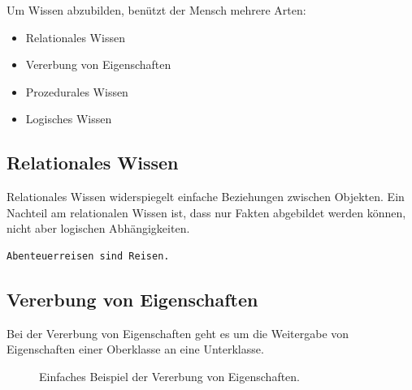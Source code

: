 Um Wissen abzubilden, benützt der Mensch mehrere Arten:
\begin{itemize}
    \item Relationales Wissen
    \item Vererbung von Eigenschaften
    \item Prozedurales Wissen
    \item Logisches Wissen
\end{itemize}
\label{itm:wissensarten}

\subsection{Relationales Wissen}
\label{subsec:relationales_wissen}
Relationales Wissen widerspiegelt einfache Beziehungen zwischen Objekten. Ein Nachteil am relationalen Wissen ist, dass nur Fakten abgebildet werden können, nicht aber logischen Abhängigkeiten.

\begin{lstlisting}[caption={Einfaches Beispiel von relationalem Wissen.}]
     Abenteuerreisen sind Reisen.
\end{lstlisting}

\newpage

\subsection{Vererbung von Eigenschaften}
\label{subsec:vererbung_eigenschaft}
Bei der Vererbung von Eigenschaften geht es um die Weitergabe von Eigenschaften einer Oberklasse an eine Unterklasse.

\begin{figure}[htbp]
\centering {}
\caption{Einfaches Beispiel der Vererbung von Eigenschaften.\label{fig:experten_systeme_vererbung}\protect\footnotemark}
\end{figure}



